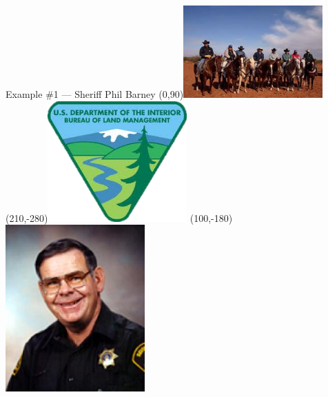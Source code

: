 %
%

\begin{frame}{Example \#1 --- Sheriff Phil Barney}
    \Put(0,90){\includegraphics[height=0.5\textheight,keepaspectratio=true,width=0.4\textwidth]{img/barney-ranchers.png}}
    \Put(210,-280){\includegraphics[height=0.5\textheight,keepaspectratio=true,width=0.4\textwidth]{img/blm.png}}
    \Put(100,-180){\includegraphics[height=0.5\textheight,keepaspectratio=true,width=0.4\textwidth]{img/phil-barney.png}}
\end{frame}

